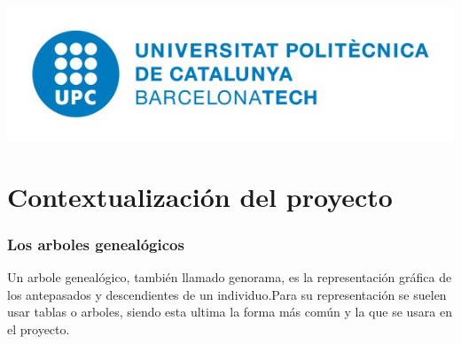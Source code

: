 \documentclass[12pt]{article} %
\begin{document}
\begin{titlepage}



\includegraphics[scale=0.7]{logo_upc.png}\\[1cm] %
 

\vfill %

\end{titlepage}


\tableofcontents %

\newpage %

\section{Contextualización del proyecto}

\subsubsection{Los arboles genealógicos}
Un arbole genealógico, también llamado genorama, es la representación gráfica de los antepasados  y descendientes de un individuo.Para su representación  se suelen usar tablas o arboles, siendo esta ultima la forma más común y la que se usara en el proyecto.
\end{document}
